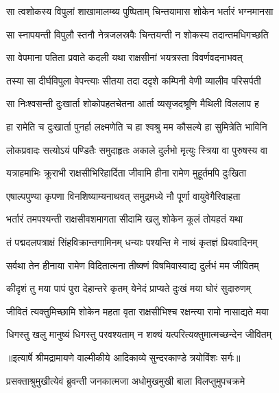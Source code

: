 \twolineshloka
{सा त्वशोकस्य विपुलां शाखामालम्ब्य पुष्पिताम्}
{चिन्तयामास शोकेन भर्तारं भग्नमानसा} %

\twolineshloka
{सा स्नापयन्ती विपुलौ स्तनौ नेत्रजलस्रवैः}
{चिन्तयन्ती न शोकस्य तदान्तमधिगच्छति} %

\twolineshloka
{सा वेपमाना पतिता प्रवाते कदली यथा}
{राक्षसीनां भयत्रस्ता विवर्णवदनाभवत्} %

\twolineshloka
{तस्या सा दीर्घविपुला वेपन्त्याः सीतया तदा}
{ददृशे कम्पिनी वेणी व्यालीव परिसर्पती} %

\twolineshloka
{सा निःश्वसन्ती दुःखार्ता शोकोपहतचेतना}
{आर्ता व्यसृजदश्रूणि मैथिली विललाप ह} %

\twolineshloka
{हा रामेति च दुःखार्ता पुनर्हा लक्ष्मणेति च}
{हा श्वश्रु मम कौसल्ये हा सुमित्रेति भाविनि} %

\twolineshloka
{लोकप्रवादः सत्योऽयं पण्डितैः समुदाहृतः}
{अकाले दुर्लभो मृत्युः स्त्रिया वा पुरुषस्य वा} %

\twolineshloka
{यत्राहमाभिः क्रूराभी राक्षसीभिरिहार्दिता}
{जीवामि हीना रामेण मुहूर्तमपि दुःखिता} %

\twolineshloka
{एषाल्पपुण्या कृपणा विनशिष्याम्यनाथवत्}
{समुद्रमध्ये नौ पूर्णा वायुवेगैरिवाहता} %

\twolineshloka
{भर्तारं तमपश्यन्ती राक्षसीवशमागता}
{सीदामि खलु शोकेन कूलं तोयहतं यथा} %

\twolineshloka
{तं पद्मदलपत्राक्षं सिंहविक्रान्तगामिनम्}
{धन्याः पश्यन्ति मे नाथं कृतज्ञं प्रियवादिनम्} %

\twolineshloka
{सर्वथा तेन हीनाया रामेण विदितात्मना}
{तीष्क्णं विषमिवास्वाद्य दुर्लभं मम जीवितम्} %

\twolineshloka
{कीदृशं तु मया पापं पुरा देहान्तरे कृतम्}
{येनेदं प्राप्यते दुःखं मया घोरं सुदारुणम्} %

\twolineshloka
{जीवितं त्यक्तुमिच्छामि शोकेन महता वृता}
{राक्षसीभिश्च रक्षन्त्या रामो नासाद्यते मया} %

\twolineshloka
{धिगस्तु खलु मानुष्यं धिगस्तु परवश्यताम्}
{न शक्यं यत्परित्यक्तुमात्मच्छन्देन जीवितम्} %


{॥इत्यार्षे श्रीमद्रामायणे वाल्मीकीये आदिकाव्ये सुन्दरकाण्डे त्रयोविंशः सर्गः॥}


\twolineshloka
{प्रसक्ताश्रुमुखीत्येवं ब्रुवन्ती जनकात्मजा}
{अधोमुखमुखी बाला विलप्तुमुपचक्रमे} %

